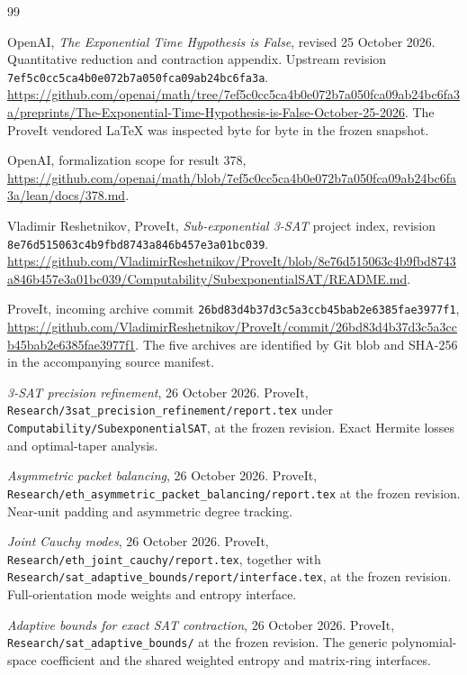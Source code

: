 \begin{thebibliography}{99}

OpenAI, \emph{The Exponential Time Hypothesis is False}, revised
25 October 2026. Quantitative reduction and contraction appendix.
Upstream revision \texttt{7ef5c0cc5ca4b0e072b7a050fca09ab24bc6fa3a}.
\url{https://github.com/openai/math/tree/7ef5c0cc5ca4b0e072b7a050fca09ab24bc6fa3a/preprints/The-Exponential-Time-Hypothesis-is-False-October-25-2026}.
The ProveIt vendored LaTeX was inspected byte for byte in the frozen
snapshot.

OpenAI, formalization scope for result 378,
\url{https://github.com/openai/math/blob/7ef5c0cc5ca4b0e072b7a050fca09ab24bc6fa3a/lean/docs/378.md}.

Vladimir Reshetnikov, ProveIt, \emph{Sub-exponential 3-SAT} project index,
revision \texttt{8e76d515063c4b9fbd8743a846b457e3a01bc039}.
\url{https://github.com/VladimirReshetnikov/ProveIt/blob/8e76d515063c4b9fbd8743a846b457e3a01bc039/Computability/SubexponentialSAT/README.md}.

ProveIt, incoming archive commit
\texttt{26bd83d4b37d3c5a3ccb45bab2e6385fae3977f1},
\url{https://github.com/VladimirReshetnikov/ProveIt/commit/26bd83d4b37d3c5a3ccb45bab2e6385fae3977f1}.
The five archives are identified by Git blob and SHA-256 in the accompanying
source manifest.

\emph{3-SAT precision refinement}, 26 October 2026.
ProveIt, \nolinkurl{Research/3sat_precision_refinement/report.tex} under
\nolinkurl{Computability/SubexponentialSAT}, at the frozen revision.
Exact Hermite losses and optimal-taper analysis.

\emph{Asymmetric packet balancing}, 26 October 2026.
ProveIt, \texttt{Research/eth\_asymmetric\_packet\_balancing/report.tex}
at the frozen revision. Near-unit padding and asymmetric degree tracking.

\emph{Joint Cauchy modes}, 26 October 2026.
ProveIt, \texttt{Research/eth\_joint\_cauchy/report.tex}, together with
\texttt{Research/sat\_adaptive\_bounds/report/interface.tex}, at the
frozen revision. Full-orientation mode weights and entropy interface.

\emph{Adaptive bounds for exact SAT contraction}, 26 October 2026.
ProveIt, \texttt{Research/sat\_adaptive\_bounds/} at the frozen revision.
The generic polynomial-space coefficient and the shared weighted entropy
and matrix-ring interfaces.


\end{thebibliography}
